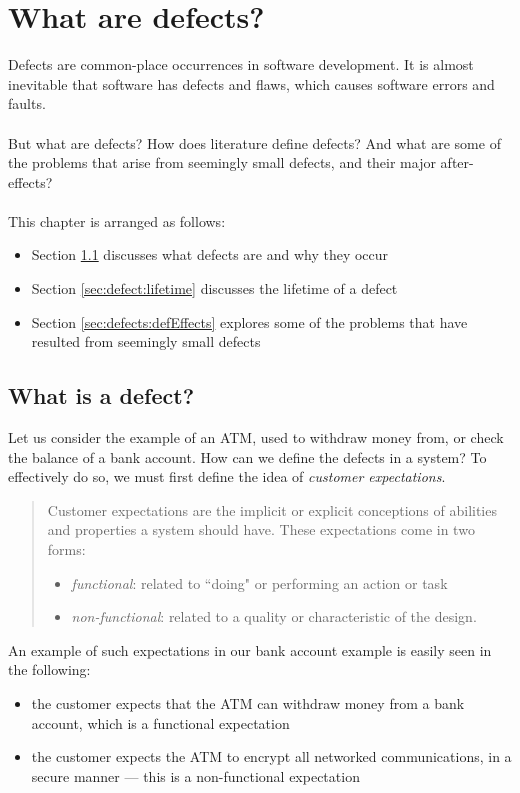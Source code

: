 \chapter{What are defects?} \label{chapter:defects}
Defects are common-place occurrences in software development.
It is almost inevitable that software has defects and flaws, which causes software errors and
faults.\\
\\
But what are defects?
How does literature define defects?
And what are some of the problems that arise from seemingly small defects,
and their major after-effects?\\
\\
This chapter is arranged as follows:
\begin{itemize}
	\item Section \ref{sec:defects:defect} discusses what defects are and why they occur
	\item Section \ref{sec:defect:lifetime} discusses the lifetime of a defect
	\item Section \ref{sec:defects:defEffects} explores some of the problems
  that have resulted from seemingly small defects
\end{itemize}

\section{What is a defect?} \label{sec:defects:defect}

Let us consider the example of an ATM, used to withdraw money from, or check the balance of a bank
account.
How can we define the defects in a system?
To effectively do so, we must first define the idea of {\em customer expectations}.
\begin{quote}
	Customer expectations are the implicit or explicit conceptions of abilities and properties a
	system should have.
	These expectations come in two forms:
	\begin{itemize}
		\item {\em functional}: related to ``doing" or performing an action or task
		\item {\em non-functional}: related to a quality or characteristic of the design.
	\end{itemize}
\end{quote}

An example of such expectations in our bank account example is easily seen in the following:
\begin{itemize}
	\item the customer expects that the ATM can withdraw money from a bank account, which is a
		functional expectation
	\item the customer expects the ATM to encrypt all networked communications, in a secure manner ---
		this is a non-functional expectation
\end{itemize}

